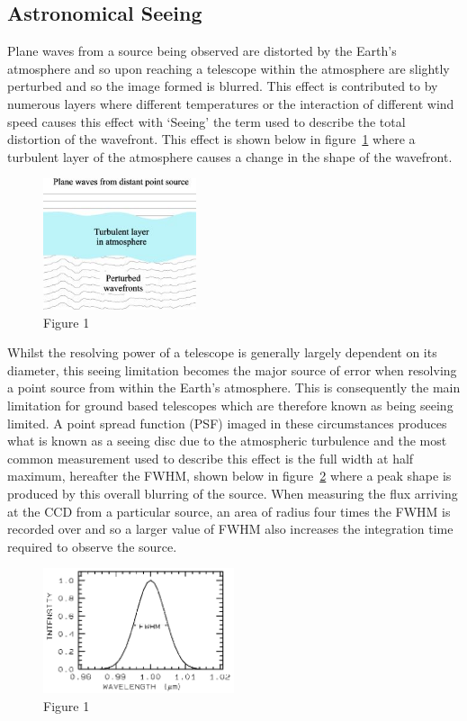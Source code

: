 	\subsection{Astronomical Seeing} %
	\label{sub:astronomical_seeing}
		Plane waves from a source being observed are distorted by the Earth’s atmosphere and so upon reaching a telescope within the atmosphere are slightly perturbed and so the image formed is blurred. This effect is contributed to by numerous layers where different temperatures or the interaction of different wind speed causes this effect with ‘Seeing’ the term used to describe the total distortion of the wavefront\cite[page~188]{Diffraction_Limited_Imaging_Saha}. This effect is shown below in figure~\ref{fig:Seeing} where a turbulent layer of the atmosphere causes a change in the shape of the wavefront.
		\begin{figure}[ht]
			\centering
			\includegraphics[width=0.4\textwidth]{../Images/Seeing.png}
			\caption{Figure 1}\label{fig:Seeing}
		\end{figure}

		Whilst the resolving power of a telescope is generally largely dependent on its diameter, this seeing limitation becomes the major source of error when resolving a point source from within the Earth’s atmosphere. This is consequently the main limitation for ground based telescopes which are therefore known as being seeing limited. A point spread function (PSF) imaged in these circumstances produces what is known as a seeing disc due to the atmospheric turbulence and the most common measurement used to describe this effect is the full width at half maximum, hereafter the FWHM, shown below in figure~\ref{fig:FWHM} where a peak shape is produced by this overall blurring of the source. When measuring the flux arriving at the CCD from a particular source, an area of radius four times the FWHM is recorded over and so a larger value of FWHM also increases the integration time required to observe the source.
		\begin{figure}[ht]
			\centering
			\includegraphics[width=0.5\textwidth]{../Images/FWHM.png}
			\caption{Figure 1}\label{fig:FWHM}
		\end{figure}

